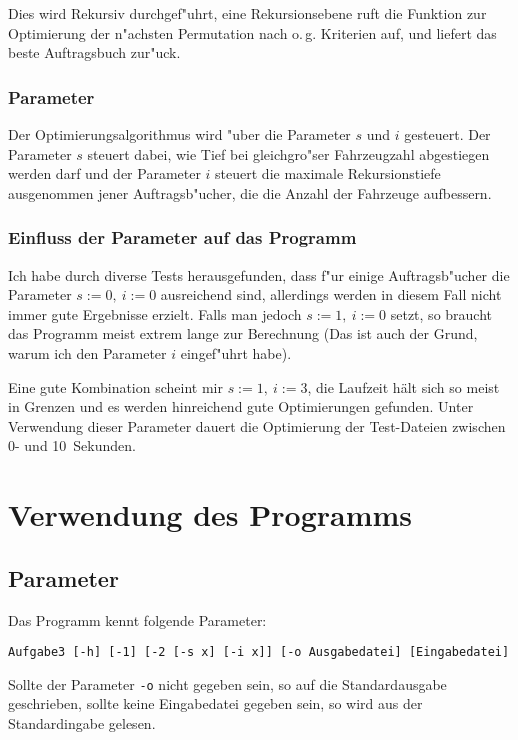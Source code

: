 \documentclass{scrreprt}
\begin{document}
Dies wird Rekursiv durchgef"uhrt, eine Rekursionsebene ruft die Funktion zur
Optimierung der n"achsten Permutation nach o.\,g. Kriterien auf, und liefert das
beste Auftragsbuch zur"uck.

\subsection{Parameter}
Der Optimierungsalgorithmus wird "uber die Parameter $s$ und $i$ gesteuert. Der
Parameter $s$ steuert dabei, wie Tief bei gleichgro"ser Fahrzeugzahl abgestiegen
werden darf und der Parameter $i$ steuert die maximale Rekursionstiefe
ausgenommen jener Auftragsb"ucher, die die Anzahl der Fahrzeuge aufbessern.

\subsection{Einfluss der Parameter auf das Programm}
Ich habe durch diverse Tests herausgefunden, dass f"ur einige Auftragsb"ucher
die Parameter $s := 0,\ i := 0$ ausreichend sind, allerdings werden in diesem
Fall nicht immer gute Ergebnisse erzielt.  Falls man jedoch $s := 1,\ i := 0$
setzt, so braucht das Programm meist extrem lange zur Berechnung (Das ist auch
der Grund, warum ich den Parameter $i$ eingef"uhrt habe).

Eine gute Kombination scheint mir $s := 1,\ i := 3$, die Laufzeit hält sich so
meist in Grenzen und es werden hinreichend gute Optimierungen gefunden.  Unter
Verwendung dieser Parameter dauert die Optimierung der Test-Dateien zwischen 0-
und 10\ Sekunden.

\chapter{Verwendung des Programms}

\section{Parameter}
Das Programm kennt folgende Parameter:

\begin{verbatim}
Aufgabe3 [-h] [-1] [-2 [-s x] [-i x]] [-o Ausgabedatei] [Eingabedatei]
\end{verbatim}

Sollte der Parameter \texttt{-o} nicht gegeben sein, so auf die Standardausgabe
geschrieben, sollte keine Eingabedatei gegeben sein, so wird aus der
Standardingabe gelesen.
\end{document}
